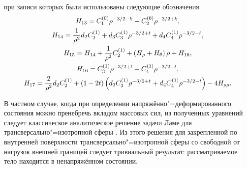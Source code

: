 \noindent при записи которых были использованы следующие
обозначения:
\begin{gather*}
H_{13} = C_1^{(0)} \rho ^{ - 3 \mathord{\left/ {\vphantom {3
2}} \right. \kern-\nulldelimiterspace} 2 - k} + C_2^{\left( 0
\right)} \rho ^{ - 3 \mathord{\left/ {\vphantom {3 2}} \right.
\kern-\nulldelimiterspace} 2 + k} ,
\\
 H_{14} = \frac{1}{\rho^2} d_2 C_2^{(1)} + d_3
C_3^{(1)} \rho ^{{ - 3} \mathord{\left/ {\vphantom {{ -
3} 2}} \right. \kern-\nulldelimiterspace} 2 + t} + d_4 C_4^{\left( 1
\right)} \rho ^{{ - 3} \mathord{\left/ {\vphantom {{ - 3} 2}}
\right. \kern-\nulldelimiterspace} 2 - t},
\\
 H_{15} = H_{14} + \frac{1}{\rho^2}C_2^{(1)} + \left( {H_\rho +
H_\theta } \right)\rho + H_{16} ,
\\
H_{16} = C_3^{(1)} \rho ^{{ - 3} \mathord{\left/
{\vphantom {{ - 3} 2}} \right. \kern-\nulldelimiterspace} 2 + t} +
C_4^{(1)} \rho ^{{ - 3} \mathord{\left/ {\vphantom {{ -
3} 2}} \right. \kern-\nulldelimiterspace} 2 - t} ,
\\
H_{17} = \frac{2}{\rho ^2}d_2 C_2^{(1)} + \left( {1 - 2t}
\right)\left( {d_3 C_3^{(1)} \rho ^{{ - 3}
\mathord{\left/ {\vphantom {{ - 3} 2}} \right.
\kern-\nulldelimiterspace} 2 + t} + d_4 C_4^{(1)} \rho
^{{ - 3} \mathord{\left/ {\vphantom {{ - 3} 2}} \right.
\kern-\nulldelimiterspace} 2 - t}} \right) - 4H_{\rho \rho}.
\end{gather*}

В частном случае, когда при определении напряжённо"=деформированного состояния можно пренебречь вкладом массовых сил, из полученных уравнений следует классическое аналитическое решение задачи Ламе для трансверсально"=изотропной сферы  \cite{Zaitsev_Fukalov:Lekhnitskiy}. 
Из этого решения для закрепленной по внутренней поверхности трансверсально"=изотропной сферы со свободной от нагрузок внешней границей следует тривиальный
результат: рассматриваемое тело находится в ненапряжённом состоянии.

\smallskip

